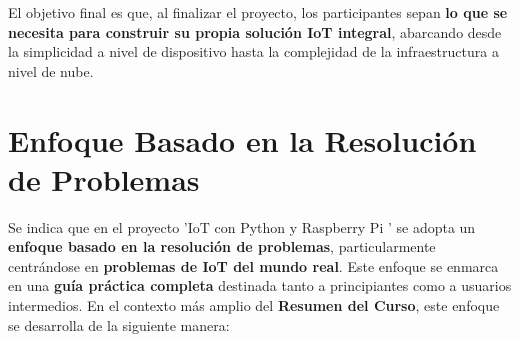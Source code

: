 \documentclass{report}
\begin{document}
El objetivo final es que, al finalizar el proyecto, los participantes sepan \textbf{lo que se necesita para construir su propia 
solución IoT integral}, abarcando desde la simplicidad a nivel de dispositivo hasta la complejidad de la infraestructura 
a nivel de nube.

\section{Enfoque Basado en la Resolución de Problemas}
Se indica que en el proyecto  'IoT con Python y Raspberry Pi ' se adopta un \textbf{enfoque basado en la resolución de problemas}, 
particularmente centrándose en \textbf{problemas de IoT del mundo real}. Este enfoque se enmarca en una \textbf{guía práctica 
completa} destinada tanto a principiantes como a usuarios intermedios. En el contexto más amplio del \textbf{Resumen del Curso}, 
este enfoque se desarrolla de la siguiente manera:
\end{document}
